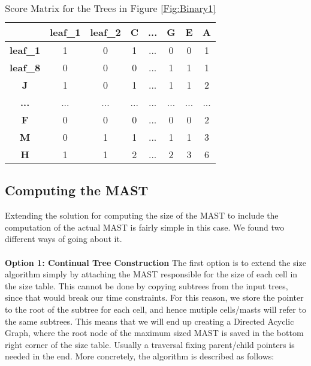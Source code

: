 \begin{table}[]
	\centering
	\begin{tabular}{|c|c|c|c|c|c|c|c|}
		\hline
		\textbf{}        & \textbf{leaf\_1} & \textbf{leaf\_2} & \textbf{C} & \textbf{...} & \textbf{G} & \textbf{E} & \textbf{A} \\ \hline
		\textbf{leaf\_1} & 1                & 0                & 1          & ...            & 0          & 0          & 1          \\ \hline
		\textbf{leaf\_8} & 0                & 0                & 0          & ...            & 1          & 1          & 1          \\ \hline
		\textbf{J}       & 1                & 0                & 1          & ...            & 1          & 1          & 2          \\ \hline
		\textbf{...}     & ...              & ...              & ...        & ...            & ...        & ...        & ...        \\ \hline
		\textbf{F}       & 0                & 0                & 0          & ...            & 0          & 0          & 2          \\ \hline
		\textbf{M}       & 0                & 1                & 1          & ...            & 1          & 1          & 3          \\ \hline
		\textbf{H}       & 1                & 1                & 2          & ...            & 2          & 3          & 6          \\ \hline
	\end{tabular}
	
	\caption{Score Matrix for the Trees in Figure \ref{Fig:Binary1}}
	\label{Table:Table1}
\end{table}




\subsection{Computing the MAST}
Extending the solution for computing the size of the MAST to include the computation of the actual MAST is fairly simple in this case. We found two different ways of going about it. 
\\
\\
\textbf{Option 1: Continual Tree Construction}
The first option is to extend the size algorithm simply by attaching the MAST responsible for the size of each cell in the size table. This cannot be done by copying subtrees from the input trees, since that would break our time constraints. For this reason, we store the pointer to the root of the subtree for each cell, and hence mutiple cells/masts will refer to the same subtrees. This means that we will end up creating a Directed Acyclic Graph, where the root node of the maximum sized MAST is saved in the bottom right corner of the size table. Usually a traversal fixing parent/child pointers is needed in the end.
More concretely, the algorithm is described as follows: 


